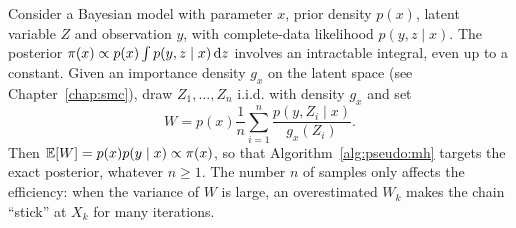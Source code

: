 \documentclass[english,graybox,envcountchap,envcountsame,sectrefs,shortlabels]{svmono}
\theoremstyle{style}
\newcommand{\eqsp}{}
\begin{document}
\begin{example}
\label{ex:pseudo:latent}
Consider a Bayesian model with parameter $x$, prior density $p(x)$, latent variable $Z$ and observation $y$, with complete-data likelihood $p(y,z\mid x)$. The posterior $\pi(x)\propto p(x)\int p(y,z\mid x)\,\mathrm{d} z$ involves an intractable integral, even up to a constant. Given an importance density $g_x$ on the latent space (see Chapter~\ref{chap:smc}), draw $Z_1,\ldots,Z_n$ i.i.d. with density $g_x$ and set
$$
W = p(x)\frac{1}{n}\sum_{i=1}^n\frac{p(y,Z_i\mid x)}{g_x(Z_i)}\eqsp.
$$
Then $\mathbb{E}[W] = p(x)p(y\mid x)\propto\pi(x)$, so that Algorithm~\ref{alg:pseudo:mh} targets the exact posterior, whatever $n\geq 1$. The number $n$ of samples only affects the efficiency: when the variance of $W$ is large, an overestimated $W_k$ makes the chain ``stick'' at $X_k$ for many iterations. %
\end{example}
\end{document}
